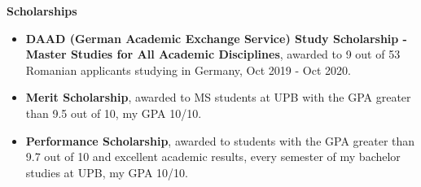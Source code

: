 \documentclass[a4paper,10pt]{article}
\newlength{\cvcolumngapwidth}
\newlength{\cvleftcolumnwidth}
\newlength{\cvrightcolumnwidth}
\newcommand{\cvheadingstyle}[1]{{\cvheadingfont\textcolor{cvheadingcolor}{#1}}}
\newlength{\cvafteritemskipamount}
\newlength{\cvbetweensectionandheadingextraskipamount}
\newlength{\cvparskip}
\newcommand{\cvitem}[2]{
    \begin{minipage}[t]{\cvleftcolumnwidth}
        \raggedleft #1
    \end{minipage}%
    \hspace{\cvcolumngapwidth}%
    \begin{minipage}[t]{\cvrightcolumnwidth}
        \setlength{\parskip}{\cvparskip} #2
    \end{minipage}

    \vspace{\cvafteritemskipamount}
}
\begin{document}
\vspace{\cvbetweensectionandheadingextraskipamount}
\cvitem{
    \cvheadingstyle{\textbf{Scholarships}}
}{
    \begin{itemize}[leftmargin=*]
        \item \textbf{DAAD (German Academic Exchange Service) Study Scholarship - Master Studies for All Academic Disciplines}, awarded to 9 out of 53 Romanian applicants studying in Germany, Oct 2019 - Oct 2020.
        \item \textbf{Merit Scholarship}, awarded to MS students at UPB with the GPA greater than 9.5 out of 10, my GPA 10/10.
        \item \textbf{Performance Scholarship}, awarded to students with the GPA greater than 9.7 out of 10 and excellent academic results, every semester of my bachelor studies at UPB, my GPA 10/10.
    \end{itemize}
}
\end{document}
